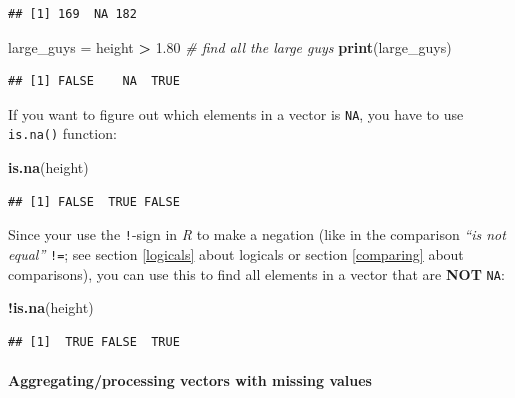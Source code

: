\documentclass[
]{scrartcl}
\newenvironment{Shaded}{\begin{snugshade}}{\end{snugshade}}
\newcommand{\CommentTok}[1]{\textcolor[rgb]{0.56,0.35,0.01}{\textit{#1}}}
\newcommand{\FloatTok}[1]{\textcolor[rgb]{0.00,0.00,0.81}{#1}}
\newcommand{\KeywordTok}[1]{\textcolor[rgb]{0.13,0.29,0.53}{\textbf{#1}}}
\newcommand{\NormalTok}[1]{#1}
\newcommand{\OperatorTok}[1]{\textcolor[rgb]{0.81,0.36,0.00}{\textbf{#1}}}
\newcommand{\StringTok}[1]{\textcolor[rgb]{0.31,0.60,0.02}{#1}}
\begin{document}
\begin{verbatim}
## [1] 169  NA 182
\end{verbatim}

\begin{Shaded}
\begin{Highlighting}[]
\NormalTok{large\_guys =}\StringTok{ }\NormalTok{height }\OperatorTok{\textgreater{}}\StringTok{ }\FloatTok{1.80}  \CommentTok{\# find all the large guys}
\KeywordTok{print}\NormalTok{(large\_guys)}
\end{Highlighting}
\end{Shaded}

\begin{verbatim}
## [1] FALSE    NA  TRUE
\end{verbatim}

If you want to figure out which elements in a vector is \texttt{NA}, you have to use \texttt{is.na()} function:

\begin{Shaded}
\begin{Highlighting}[]
\KeywordTok{is.na}\NormalTok{(height)}
\end{Highlighting}
\end{Shaded}

\begin{verbatim}
## [1] FALSE  TRUE FALSE
\end{verbatim}

Since your use the \texttt{!}-sign in \emph{R} to make a negation (like in the comparison \emph{``is not equal''} \texttt{!=}; see section \ref{logicals} about logicals or section \ref{comparing} about comparisons), you can use this to find all elements in a vector that are \textbf{NOT} \texttt{NA}:

\begin{Shaded}
\begin{Highlighting}[]
\OperatorTok{!}\KeywordTok{is.na}\NormalTok{(height)}
\end{Highlighting}
\end{Shaded}

\begin{verbatim}
## [1]  TRUE FALSE  TRUE
\end{verbatim}

\hypertarget{aggregatingprocessing-vectors-with-missing-values}{%
\paragraph*{Aggregating/processing vectors with missing values}\label{aggregatingprocessing-vectors-with-missing-values}}
\end{document}
